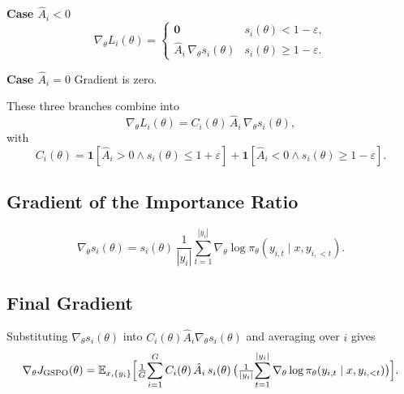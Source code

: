 \documentclass{article}
\begin{document}
\textbf{Case $\hat{A}_i<0$}
  \[
  \nabla_\theta L_i(\theta)=
  \begin{cases}
  \mathbf{0} & s_i(\theta)<1-\varepsilon,\\[4pt]
  \hat{A}_i\,\nabla_\theta s_i(\theta) & s_i(\theta)\ge 1-\varepsilon.
  \end{cases}
  \]

\textbf{Case $\hat{A}_i=0$}
  Gradient is zero.

These three branches combine into  
\[
\nabla_\theta L_i(\theta)=
C_i(\theta)\,\hat{A}_i\,\nabla_\theta s_i(\theta),
\]
with
\[
C_i(\theta)=
\mathbf{1}\![\hat{A}_i>0\land s_i(\theta)\le1+\varepsilon]
+\mathbf{1}\![\hat{A}_i<0\land s_i(\theta)\ge1-\varepsilon].
\]

\subsection{ Gradient of the Importance Ratio}

\[
\nabla_\theta s_i(\theta)=
s_i(\theta)\,
\frac{1}{|y_i|}
\sum_{t=1}^{|y_i|}
\nabla_\theta\log\pi_\theta(y_{i,t}\mid x,y_{i,<t}).
\]

\subsection{ Final Gradient}

Substituting $\nabla_\theta s_i(\theta)$ into $C_i(\theta)\hat{A}_i\nabla_\theta s_i(\theta)$ and averaging over $i$ gives
\[
\nabla_\theta J_{\text{GSPO}}(\theta)=
\mathbb{E}_{x,\{y_i\}}
\Bigl[
\tfrac{1}{G}\!\sum_{i=1}^G
C_i(\theta)\,\hat{A}_i\,s_i(\theta)\,
\bigl(\tfrac{1}{|y_i|}\!\sum_{t=1}^{|y_i|}\nabla_\theta\log\pi_\theta(y_{i,t}\mid x,y_{i,<t})\bigr)
\Bigr].
\]
\end{document}
